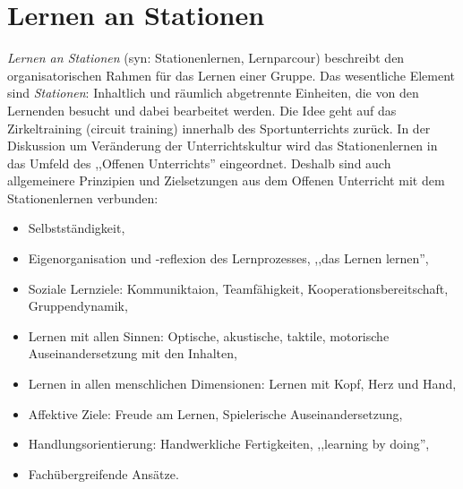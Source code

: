 \bip\bip
\section{Lernen an Stationen}

\emph{Lernen an Stationen} (syn: Stationenlernen, Lernparcour) beschreibt den organisatorischen Rahmen f\"{u}r
das Lernen einer Gruppe. Das wesentliche Element sind \emph{Stationen}: Inhaltlich und r\"{a}umlich abgetrennte Einheiten, die von den Lernenden besucht und dabei bearbeitet werden.
\mip
Die Idee geht auf das Zirkeltraining (circuit training) innerhalb des Sportunterrichts zur\"{u}ck.
In der Diskussion um Ver\"{a}nderung der Unterrichtskultur wird das Stationenlernen
in das Umfeld des ,,Offenen Unterrichts'' eingeordnet.
\mip
Deshalb sind auch allgemeinere Prinzipien und Zielsetzungen aus dem Offenen Unterricht
mit dem Stationenlernen verbunden:
\begin{itemize}
\item Selbstst\"{a}ndigkeit,
\item Eigenorganisation und -reflexion des Lernprozesses, ,,das Lernen lernen'',
\item Soziale Lernziele: Kommuniktaion, Teamf\"{a}higkeit, Kooperationsbereitschaft, Gruppendynamik,
\item Lernen mit allen Sinnen: Optische, akustische, taktile, motorische Auseinandersetzung mit den Inhalten,
\item Lernen in allen menschlichen Dimensionen: Lernen mit Kopf, Herz und Hand,
\item Affektive Ziele: Freude am Lernen, Spielerische Auseinandersetzung,
\item Handlungsorientierung: Handwerkliche Fertigkeiten, ,,learning by doing'',
\item Fach\"{u}bergreifende Ans\"{a}tze.
\end{itemize}

